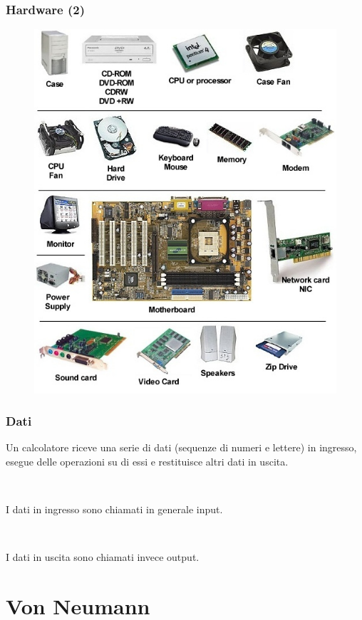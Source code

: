 \documentclass[]{beamer}
\begin{document}
\begin{frame}
\frametitle{Hardware (2)}
\begin{figure}
  \includegraphics[width=.5\columnwidth]{img/hardware2.jpg}
\end{figure}
\end{frame}





\begin{frame}
\frametitle{Dati}
Un calcolatore riceve una serie di dati (sequenze di numeri e lettere) in ingresso, \alert<1>{esegue delle operazioni} su di essi e restituisce altri dati in uscita.\pause

~

I dati in ingresso sono chiamati in generale \alert<2>{input}.\pause

~

I dati in uscita sono chiamati invece \alert<3>{output}.
\end{frame}


\section{Von Neumann}
\end{document}
